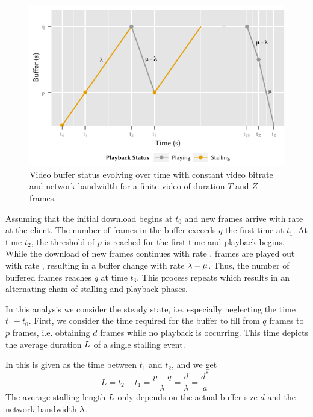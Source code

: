 \begin{figure}
  \centering
  \includegraphics{application/qoe_user_behaviour/system_model/figures/player}
  \caption{Video buffer status evolving over time with constant video bitrate and network bandwidth for a finite video of duration \(T\) and \(Z\) frames.}
  \label{fig:application:qoe_user_behaviour:system_model:steady_state:player}
\end{figure}

Assuming that the initial download begins at \(t_0\) and new frames arrive with rate \networkBandwidth at the client.
The number of frames in the buffer exceeds \(q\) the first time at \(t_1\).
At time \(t_2\), the threshold of \(p\) is reached for the first time and playback begins.
While the download of new frames continues with rate \networkBandwidth, frames are played out with rate \playbackRate, resulting in a buffer change with rate \(\lambda - \mu\).
Thus, the number of buffered frames reaches \(q\) at time \(t_3\).
This process repeats which results in an alternating chain of stalling and playback phases.

In this analysis we consider the steady state, i.e. especially neglecting the time \(t_1 - t_0\).
First, we consider the time required for the buffer to fill from \(q\) frames to \(p\) frames, i.e. obtaining \(d\) frames while no playback is occurring.
This time depicts the average duration \(L\) of a single stalling event.

In  this is given as the time between \(t_1\) and \(t_2\), and we get
\begin{equation}
L=t_2-t_1 = \frac{p-q}{\lambda}=\frac{d}{\lambda} = \frac{d^*}{a}\, .
\label{eq:application:qoe_user_behaviour:system_model:steady_state:mean_stalling_event}
\end{equation}
The average stalling length \(L\) only depends on the actual buffer size \(d\) and the network bandwidth \(\lambda\).

